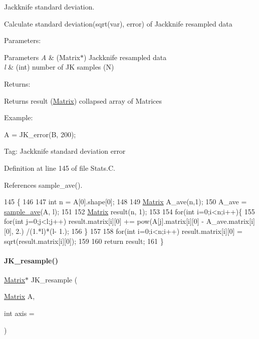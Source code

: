 Jackknife standard deviation. 

Calculate standard deviation(sqrt(var), error) of Jackknife resampled data

Parameters\+: 
\begin{DoxyParams}{Parameters}
{\em A} & (Matrix$\ast$) Jackknife resampled data \\
\hline
{\em l} & (int) number of JK samples (N)\\
\hline
\end{DoxyParams}
Returns\+: \begin{DoxyReturn}{Returns}
result (\hyperlink{classMatrix}{Matrix}) collapsed array of Matrices
\end{DoxyReturn}
Example\+:

A = J\+K\+\_\+error(\+B, 200);

Tag\+: Jackknife standard deviation error 

Definition at line 145 of file Stats.\+C.



References sample\+\_\+ave().


\begin{DoxyCode}
145                                  \{
146 
147   \textcolor{keywordtype}{int} n = A[0].shape[0];
148   
149   \hyperlink{classMatrix}{Matrix} A\_ave(n,1);
150   A\_ave = \hyperlink{Stats_8C_affd6f6d5163a812e041030361c401f90}{sample\_ave}(A, l);
151 
152   \hyperlink{classMatrix}{Matrix} result(n, 1);
153 
154   \textcolor{keywordflow}{for}(\textcolor{keywordtype}{int} i=0;i<n;i++)\{
155     \textcolor{keywordflow}{for}(\textcolor{keywordtype}{int} j=0;j<l;j++) result.matrix[i][0] += pow(A[j].matrix[i][0] - A\_ave.matrix[i][0], 2.) /(1.*l)*(l-
      1.);
156   \}
157 
158   \textcolor{keywordflow}{for}(\textcolor{keywordtype}{int} i=0;i<n;i++) result.matrix[i][0] = sqrt(result.matrix[i][0]);
159 
160   \textcolor{keywordflow}{return} result;
161 \}
\end{DoxyCode}
\mbox{\label{Stats_8C_a143c09048292af2563e2996d2c2f4922}} 
\paragraph{\texorpdfstring{J\+K\+\_\+resample()}{JK\_resample()}}
{\footnotesize\ttfamily \hyperlink{classMatrix}{Matrix}$\ast$ J\+K\+\_\+resample (\begin{DoxyParamCaption}\item[{\hyperlink{classMatrix}{Matrix}}]{A,  }\item[{int}]{axis = {} }\end{DoxyParamCaption})}




